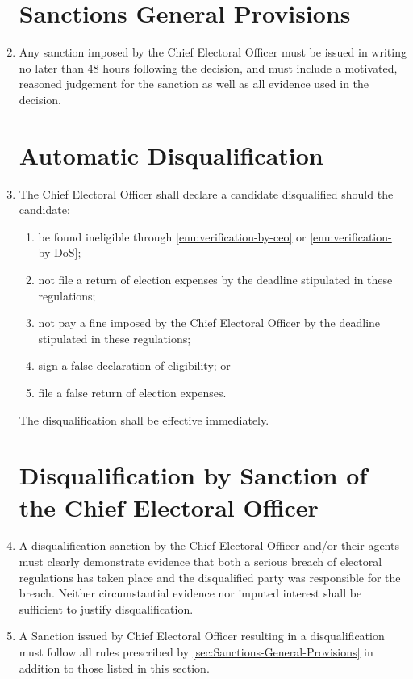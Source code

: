\documentclass[oneside]{book}
\begin{document}
\begin{enumerate}
\section{\label{sec:Sanctions-General-Provisions}Sanctions General Provisions}
\item \label{sanction-written-deicision}Any sanction imposed by the Chief
Electoral Officer must be issued in writing no later than 48 hours
following the decision, and must include a motivated, reasoned judgement
for the sanction as well as all evidence used in the decision.

\section{\label{sec:Automatic-Disqualification}Automatic Disqualification}
\item The Chief Electoral Officer shall declare a candidate disqualified
should the candidate:

\begin{enumerate}
\item be found ineligible through \autoref{enu:verification-by-ceo}
or \autoref{enu:verification-by-DoS};
\item not file a return of election expenses by the deadline stipulated
in these regulations;
\item not pay a fine imposed by the Chief Electoral Officer by the deadline
stipulated in these regulations;
\item sign a false declaration of eligibility; or
\item file a false return of election expenses.
\end{enumerate} The disqualification shall be effective immediately.

\section{\label{sec:Disqualification-by-Sanction}Disqualification by Sanction
of the Chief Electoral Officer}
\item A disqualification sanction by the Chief Electoral Officer and/or
their agents must clearly demonstrate evidence that both a serious
breach of electoral regulations has taken place and the disqualified
party was responsible for the breach. Neither circumstantial evidence
nor imputed interest shall be sufficient to justify disqualification.
\item A Sanction issued by Chief Electoral Officer resulting in a disqualification
must follow all rules prescribed by \autoref{sec:Sanctions-General-Provisions}
in addition to those listed in this section.


\end{enumerate}
\end{document}
